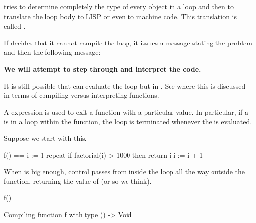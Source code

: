 {\Language{} tries to determine completely the type of every
object in a loop and then to translate the loop body to LISP or even to
machine code.
This translation is called .

If \Language{} decides that it cannot compile the loop, it issues a
message stating the problem and then the following message:
%
\begin{center}
{\bf We will attempt to step through and interpret the code.}
\end{center}
%
It is still possible that \Language{} can evaluate the loop but in
.
See  where this is discussed in terms
of compiling versus interpreting functions.


A  expression is used to exit a function with
a particular value.
In particular, if a  is in a loop within the
function, the loop is terminated whenever the 
is evaluated.
\begin{xtc}
\begin{xtccomment}
Suppose we start with this.
\end{xtccomment}
\begin{spadsrc}
f() ==
  i := 1
  repeat
    if factorial(i) > 1000 then return i
    i := i + 1
\end{spadsrc}
\end{xtc}
\begin{xtc}
\begin{xtccomment}
When  is big enough, control passes from
inside the loop all the way outside the function, returning the
value of  (or so we think).
\end{xtccomment}
\begin{spadsrc}
f() 
\end{spadsrc}
\begin{MessageOutput}
   Compiling function f with type () -> Void 
\end{MessageOutput}
\end{xtc}

}

